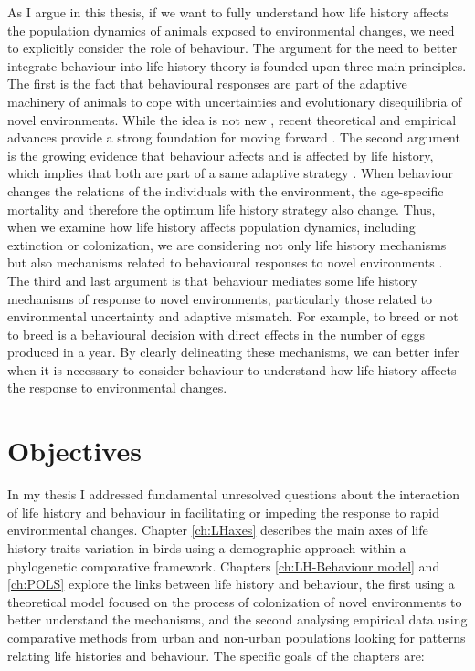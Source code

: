 As I argue in this thesis, if we want to fully understand how life history
affects the population dynamics of animals exposed to environmental changes, we
need to explicitly consider the role of behaviour. The argument for the need
to better integrate behaviour into life history theory is founded upon three
main principles.
The first is the fact that behavioural responses are part of the adaptive
machinery of animals to cope with uncertainties and evolutionary disequilibria
of novel environments. While the idea is not new \citep{mayr1965}, recent
theoretical and empirical advances provide a strong foundation for moving
forward \citep{Sol2020, Ducatez2020}.
The second argument is the growing evidence that behaviour affects and is
affected by life history, which implies that both are part of a same adaptive
strategy \citep{Ricklefs2002,Reale2010a,Sol2016,Sol2016a}. When behaviour
changes the relations of the individuals with the environment, the age-specific
mortality and therefore the optimum life history strategy also change. Thus,
when we examine how life history affects population dynamics, including
extinction or colonization, we are considering not only life history mechanisms
but also mechanisms related to behavioural responses to novel environments
\citep{Sol2016}.
The third and last argument is that behaviour mediates some life history
mechanisms of response to novel environments, particularly those related to
environmental uncertainty and adaptive mismatch. For example, to breed or not
to breed is a behavioural decision with direct effects in the number of eggs
produced in a year.
By clearly delineating these mechanisms, we can better infer when it is
necessary to consider behaviour to understand how life history affects the
response to environmental changes.


\section{Objectives}

In my thesis I addressed fundamental unresolved questions about the 
interaction of life history and behaviour in facilitating or impeding the 
response to rapid environmental changes. Chapter \ref{ch:LHaxes} describes the 
main axes of life history traits variation in birds using a demographic
approach within a phylogenetic comparative framework. Chapters
\ref{ch:LH-Behaviour model} and \ref{ch:POLS} explore the links between life
history and behaviour, the first using a theoretical model focused on the
process of colonization of novel environments to better understand the
mechanisms, and the second analysing empirical data using comparative methods
from urban and non-urban populations looking for patterns relating life
histories and behaviour. The specific goals of the chapters are:


